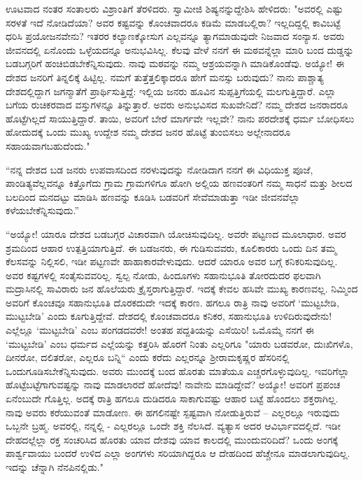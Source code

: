 ಊಟವಾದ ನಂತರ ಸಂತಾಲರು ವಿಶ್ರಾಂತಿಗೆ ತೆರಳಿದರು. ಸ್ವಾಮೀಜಿ ಶಿಷ್ಯನನ್ನುದ್ದೇಶಿಸಿ ಹೇಳಿದರು: "ಅವರಲ್ಲಿ ಎಷ್ಟು ಸರಳತೆ ಇದೆ ನೋಡಿದೆಯಾ? ಅವರ ಕಷ್ಟವನ್ನು ಕೊಂಚವಾದರೂ ಕಡಿಮೆ ಮಾಡಬಲ್ಲಿರಾ? ಇಲ್ಲದಿದ್ದಲ್ಲಿ ಕಾವಿಬಟ್ಟೆ ಧರಿಸಿ ಪ್ರಯೋಜನವೇನು? ಇತರರ ಕಲ್ಯಾಣಕ್ಕೋಸುಗ ಎಲ್ಲವನ್ನೂ ತ್ಯಾಗಮಾಡುವುದೇ ನಿಜವಾದ ಸಂನ್ಯಾಸ. ಅವರು ಜೀವನದಲ್ಲಿ ಏನೊಂದು ಒಳ್ಳೆಯದನ್ನೂ ಅನುಭವಿಸಿಲ್ಲ. ಕೆಲವು ವೇಳೆ ನನಗೆ ಈ ಮಠವನ್ನೆಲ್ಲಾ ಮಾರಿ ಬಂದ ದುಡ್ಡನ್ನು ಬಡಬಗ್ಗರಿಗೆ ಹಂಚಿಬಿಡಬೇಕೆನ್ನಿಸುವುದು. ನಾವು ಮಠವನ್ನು ನಮ್ಮ ಆಶ್ರಯವನ್ನಾಗಿ ಮಾಡಿಕೊಂಡೆವು. ಅಯ್ಯೋ! ಈ ದೇಶದ ಜನರಿಗೆ ತಿನ್ನಲಿಕ್ಕೆ ಹಿಟ್ಟಿಲ್ಲ. ನಮಗೆ ತುತ್ತೆತ್ತಲಿಕ್ಕಾದರೂ ಹೇಗೆ ಮನಸ್ಸು ಬರುವುದು? ನಾನು ಪಾಶ್ಚಾತ್ಯ ದೇಶದಲ್ಲಿದ್ದಾಗ ಜಗನ್ಮಾತೆಗೆ ಪ್ರಾರ್ಥಿಸುತ್ತಿದ್ದೆ: ಇಲ್ಲಿಯ ಜನರು ಹೂವಿನ ಸುಪ್ಪತ್ತಿಗೆಯಲ್ಲಿ ಮಲಗುತ್ತಿದ್ದಾರೆ. ಎಲ್ಲಾ ಬಗೆಯ ರುಚಿಕರವಾದ ವಸ್ತುಗಳನ್ನೂ ತಿನ್ನುತ್ತಾರೆ. ಅವರು ಅನುಭವಿಸದ ಸುಖವೇನಿದೆ? ನಮ್ಮ ದೇಶದ ಜನರಾದರೂ ಹೊಟ್ಟೆಗಿಲ್ಲದೆ ಸಾಯುತ್ತಿದ್ದಾರೆ. ತಾಯಿ, ಅವರಿಗೆ ಬೇರೆ ಮಾರ್ಗವೇ ಇಲ್ಲವೇ? ನಾನು ಪರದೇಶಕ್ಕೆ ಧರ್ಮ ಬೋಧಿಸಲು ಹೋದುದಕ್ಕೆ ಒಂದು ಮುಖ್ಯ ಉದ್ದೇಶ ನಮ್ಮ ದೇಶದ ಜನರ ಹೊಟ್ಟೆ ತುಂಬಿಸಲು ಅಲ್ಲೇನಾದರೂ ಸಹಾಯವಾಗಬಹುದೆಂದು."

“ನನ್ನ ದೇಶದ ಬಡ ಜನರು ಉಪವಾಸದಿಂದ ನರಳುವುದನ್ನು ನೋಡಿದಾಗ ನನಗೆ ಈ ವಿಧಿಯುಕ್ತ ಪೂಜೆ, ಪಾಂಡಿತ್ಯವೆಲ್ಲವನ್ನೂ ಕಿತ್ತೊಗೆದು ಗ್ರಾಮ ಗ್ರಾಮಗಳಿಗೂ ಹೋಗಿ ಅಲ್ಲಿಯ ಹಣವಂತರಿಗೆ ನಮ್ಮ ಸಾಧನೆ ಮತ್ತು ಶೀಲದ ಬಲದಿಂದ ಮನದಟ್ಟು ಮಾಡಿಸಿ ಹಣವನ್ನು ಕೂಡಿಸಿ ಬಡವರಿಗೆ ಸೇವೆಮಾಡುತ್ತಾ ಇಡೀ ಜೀವನವೆಲ್ಲಾ ಕಳೆಯಬೇಕೆನ್ನಿಸುವುದು.”

“ಅಯ್ಯೋ! ಯಾರೂ ದೇಶದ ಬಡಬಗ್ಗರ ವಿಚಾರವಾಗಿ ಯೋಚಿಸುವುದಿಲ್ಲ. ಅವರೇ ಪಟ್ಟಣದ ಮೂಲಾಧಾರ. ಅವರ ಶ್ರಮದಿಂದ ಆಹಾರ ಉತ್ಪತ್ತಿಯಾಗುತ್ತಿದೆ. ಈ ಬಡಜನರು, ಈ ಗುಡಿಸುವವರು, ಕೂಲಿಕಾರರು ಒಂದು ದಿನ ತಮ್ಮ ಕೆಲಸವನ್ನು ನಿಲ್ಲಿಸಲಿ, ಇಡೀ ಪಟ್ಟಣವೇ ಹಾಹಾಕಾರವೇಳುವುದು. ಆದರೆ ಯಾರೂ ಅವರ ಬಗ್ಗೆ ಕನಿಕರಿಸುವುದಿಲ್ಲ. ಅವರ ಕಷ್ಟಗಳಲ್ಲಿ ಸಂತೈಸುವವರಿಲ್ಲ. ಸ್ವಲ್ಪ ನೋಡು, ಹಿಂದೂಗಳು ಸಹಾನುಭೂತಿ ತೋರದುದರ ಫಲವಾಗಿ ಮದ್ರಾಸಿನಲ್ಲಿ ಸಾವಿರಾರು ಜನ ಹೊಲೆಯರು ಕ್ರೈಸ್ತರಾಗುತ್ತಿದ್ದಾರೆ. ಇದಕ್ಕೆ ಕೇವಲ ಹಸಿವೇ ಮುಖ್ಯ ಕಾರಣವಲ್ಲ. ನಿಮ್ಮಿಂದ ಅವರಿಗೆ ಕೊಂಚವೂ ಸಹಾನುಭೂತಿ ದೊರಕದುದೇ ಇದಕ್ಕೆ ಕಾರಣ. ಹಗಲೂ ರಾತ್ರಿ ನಾವು ಅವರಿಗೆ ‘ಮುಟ್ಟಬೇಡಿ, ಮುಟ್ಟಬೇಡಿ’ ಎಂದು ಕೂಗುತ್ತಿದ್ದೇವೆ. ದೇಶದಲ್ಲಿ ಕೊಂಚವಾದರೂ ಕನಿಕರ, ಸಹಾನುಭೂತಿ ಉಳಿದಿರುವುದೇನು! ಎಲ್ಲೆಲ್ಲೂ ‘ಮುಟ್ಟಬೇಡಿ’ ಎಂಬ ಪಂಗಡದವರೇ! ಅಂತಹ ಪದ್ದತಿಯನ್ನು ಎಸೆಯಿರಿ! ಒಮೊಮ್ಮೆ ನನಗೆ ಈ ‘ಮುಟ್ಟಬೇಡಿ’ ಎಂಬ ಧರ್ಮದ ಎಲ್ಲೆಯನ್ನು ಕತ್ತರಿಸಿ ಹೊರಗೆ ನಿಂತು ಎಲ್ಲರಿಗೂ "ಯಾರು ಬಡವರೋ, ದುಃಖಿಗಳೊ, ದೀನರೋ, ದಲಿತರೋ, ಎಲ್ಲರೂ ಬನ್ನಿ“ ಎಂದು ಕರೆದು ಎಲ್ಲರನ್ನೂ ಶ‍್ರೀರಾಮಕೃಷ್ಣರ ಹೆಸರಿನಲ್ಲಿ ಒಂದುಗೂಡಿಸಬೇಕೆನ್ನಿಸುವುದು. ಅವರು ಮುಂದಕ್ಕೆ ಬಂದ ಹೊರತು ಮಾತೆಯೂ ಎಚ್ಚರಗೊಳ್ಳುವುದಿಲ್ಲ. ಇವರಿಗೆಲ್ಲಾ ಹೊಟ್ಟೆಬಟ್ಟೆಗಾಗುವಷ್ಟನ್ನು ನಾವು ಮಾಡಲಾರದೆ ಹೋದೆವು! ನಾವೇನು ಮಾಡಿದ್ದೇವೆ? ಅಯ್ಯೋ! ಅವರಿಗೆ ಪ್ರಪಂಚ ಏನೆಂಬುದೇ ಗೊತ್ತಿಲ್ಲ. ಅದಕ್ಕೆ ರಾತ್ರಿ ಹಗಲೂ ದುಡಿದರೂ ಸಾಕಾಗುವಷ್ಟು ಆಹಾರ ಬಟ್ಟೆ ಹೊಂದಲು ಶಕ್ತರಾಗಿಲ್ಲ. ನಾವು ಅವರು ಕರೆಯುವಂತೆ ಮಾಡೋಣ. ಈ ಹಗಲಿನಷ್ಟೇ ಸ್ಪಷ್ಟವಾಗಿ ನೋಡುತ್ತಿರುವೆ – ಎಲ್ಲರಲ್ಲೂ ಇರುವುದು ಒಬ್ಬನೇ ಬ್ರಹ್ಮ. ಅವರಲ್ಲಿ, ನನ್ನಲ್ಲಿ - ಎಲ್ಲರಲ್ಲೂ ಒಂದೇ ಶಕ್ತಿ ನೆಲಸಿದೆ. ವ್ಯತ್ಯಾಸ ಅದರ ಆವಿರ್ಭಾವದಲ್ಲಿದೆ. ಇಡೀ ದೇಹದಲ್ಲೆಲ್ಲಾ ರಕ್ತ ಸಂಚರಿಸಿದ ಹೊರತು ಯಾವ ದೇಶವು ಯಾವ ಕಾಲದಲ್ಲಿ ಮುಂದುವರಿದಿದೆ? ಒಂದು ಅಂಗಕ್ಕೆ ಪಾರ್ಶ್ವವಾಯು ಬಂದರೆ ಉಳಿದ ಎಲ್ಲಾ ಅಂಗಗಳು ಸರಿಯಾಗಿದ್ದರೂ ಆ ದೇಹದಿಂದ ಹೆಚ್ಚೇನೂ ಮಾಡಲಾಗುವುದಿಲ್ಲ. ಇದನ್ನು ಚೆನ್ನಾಗಿ ನೆನಪಿನಲ್ಲಿಡು."

